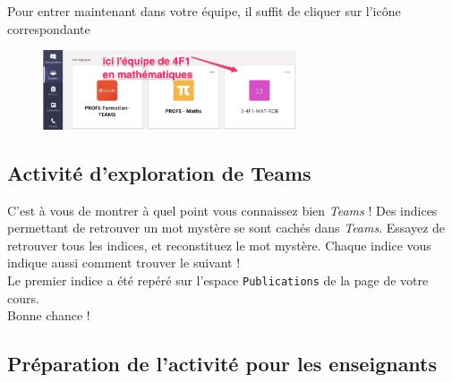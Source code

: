  Pour entrer maintenant dans votre équipe, il suffit de cliquer sur l'icône correspondante

\begin{figure}[H]
\includegraphics[width=7.5cm]{./images/teams/entree_classe}
\centering
\end{figure}

\subsection{Activité d'exploration de Teams}

C'est à vous de montrer à quel point vous connaissez bien \emph{Teams} ! Des indices permettant de retrouver un mot mystère se sont cachés dans \emph{Teams}. Essayez de retrouver tous les indices, et reconstituez le mot mystère. Chaque indice vous indique aussi comment trouver le suivant !\\

Le premier indice a été repéré sur l'espace \texttt{Publications} de la page de votre cours. \\Bonne chance !


\subsection*{Préparation de l'activité pour les enseignants}


